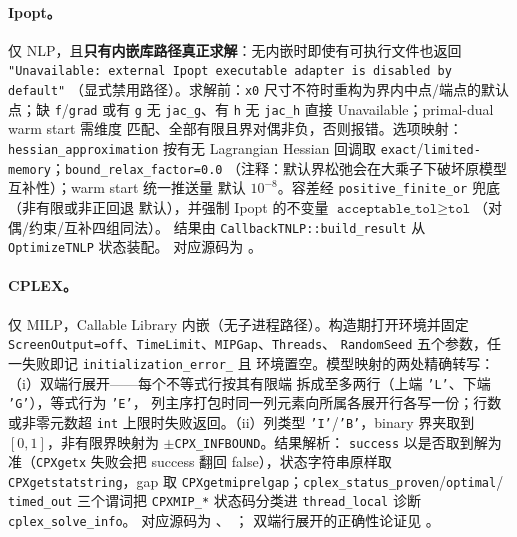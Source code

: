 \paragraph{Ipopt。}
仅 NLP，且\textbf{只有内嵌库路径真正求解}：无内嵌时即使有可执行文件也返回
\texttt{"Unavailable: external Ipopt executable adapter is disabled by default"}
（显式禁用路径）。求解前：\texttt{x0} 尺寸不符时重构为界内中点/端点的默认
点；缺 \texttt{f}/\texttt{grad} 或有 \texttt{g} 无 \texttt{jac\_g}、有
\texttt{h} 无 \texttt{jac\_h} 直接 Unavailable；primal-dual warm start 需维度
匹配、全部有限且界对偶非负，否则报错。选项映射：
\texttt{hessian\_approximation} 按有无 Lagrangian Hessian 回调取
\texttt{exact}/\texttt{limited-memory}；\texttt{bound\_relax\_factor=0.0}
（注释：默认界松弛会在大乘子下破坏原模型互补性）；warm start 统一推送量
默认 $10^{-8}$。容差经 \texttt{positive\_finite\_or} 兜底（非有限或非正回退
默认），并强制 Ipopt 的不变量
$\texttt{acceptable\_tol}\ge\texttt{tol}$（对偶/约束/互补四组同法）。
结果由 \texttt{CallbackTNLP::build\_result} 从 \texttt{OptimizeTNLP} 状态装配。
对应源码为
。

\paragraph{CPLEX。}
仅 MILP，Callable Library 内嵌（无子进程路径）。构造期打开环境并固定
\texttt{ScreenOutput=off}、\texttt{TimeLimit}、\texttt{MIPGap}、\texttt{Threads}、
\texttt{RandomSeed} 五个参数，任一失败即记 \texttt{initialization\_error\_} 且
环境置空。模型映射的两处精确转写：（i）双端行展开——每个不等式行按其有限端
拆成至多两行（上端 \texttt{'L'}、下端 \texttt{'G'}），等式行为 \texttt{'E'}，
列主序打包时同一列元素向所属各展开行各写一份；行数或非零元数超
\texttt{int} 上限时失败返回。（ii）列类型 \texttt{'I'}/\texttt{'B'}，binary
界夹取到 $[0,1]$，非有限界映射为 $\pm$\texttt{CPX\_INFBOUND}。结果解析：
\texttt{success} 以是否取到解为准（\texttt{CPXgetx} 失败会把 success 翻回
false），状态字符串原样取 \texttt{CPXgetstatstring}，gap 取
\texttt{CPXgetmiprelgap}；\texttt{cplex\_status\_proven}/\texttt{optimal}/%
\texttt{timed\_out} 三个谓词把 \texttt{CPXMIP\_*} 状态码分类进
\texttt{thread\_local} 诊断 \texttt{cplex\_solve\_info}。
对应源码为
、
；
双端行展开的正确性论证见
。

